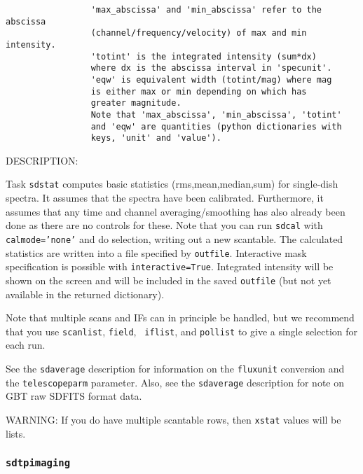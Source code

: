 \begin{verbatim}
                 'max_abscissa' and 'min_abscissa' refer to the abscissa
                 (channel/frequency/velocity) of max and min intensity.
                 'totint' is the integrated intensity (sum*dx)
                 where dx is the abscissa interval in 'specunit'.
                 'eqw' is equivalent width (totint/mag) where mag
                 is either max or min depending on which has
                 greater magnitude. 
                 Note that 'max_abscissa', 'min_abscissa', 'totint' 
                 and 'eqw' are quantities (python dictionaries with
                 keys, 'unit' and 'value').

\end{verbatim}

DESCRIPTION: 

Task {\tt sdstat} computes basic statistics (rms,mean,median,sum)
for single-dish spectra.  It assumes that the spectra have
been calibrated.  Furthermore, it assumes that any
time and channel averaging/smoothing has also already been done as
there are no controls for these. Note that you can run {\tt sdcal}
with {\tt calmode='none'} and do selection, writing out a new
scantable.
The calculated statistics are written into a file specified by
{\tt outfile}.
Interactive mask specification is possible with {\tt interactive=True}.
Integrated intensity will be shown on the screen and will be included
in the saved {\tt outfile} (but not yet available in the returned dictionary).

Note that multiple scans and IFs can in principle be handled, but
we recommend that you use {\tt scanlist}, {\tt field}, {\tt
iflist}, and {\tt pollist} to give a single selection for each run.

See the {\tt sdaverage} description for information on the {\tt fluxunit} 
conversion and the {\tt telescopeparm} parameter.
Also, see the {\tt sdaverage} description for note on GBT raw SDFITS format data.

WARNING: If you do have multiple scantable rows, then {\tt xstat}
values will be lists.


\subsubsection{{\tt sdtpimaging}}
\label{section:sd.sdtasks.tasks.sdtpimaging}

